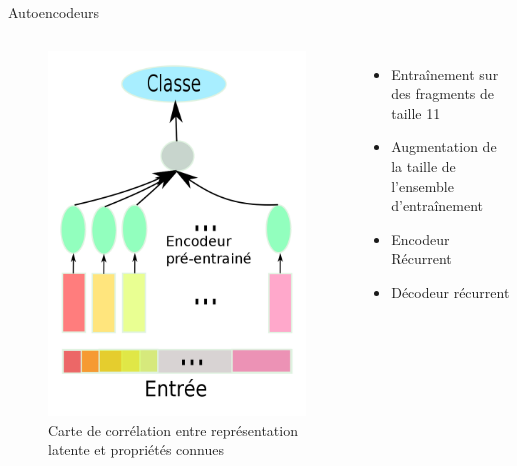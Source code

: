 \documentclass{beamer}
\begin{document}
\begin{frame}{Autoencodeurs}

  \begin{columns}
    \begin{figure}
      \centering
      \includegraphics[scale=0.1]{../Figures/Class}
      \caption{Carte de corrélation entre représentation latente et propriétés connues}
    \end{figure}

    \begin{itemize}
    \item Entraînement sur des fragments de taille 11\pause
    \item Augmentation de la taille de l'ensemble d'entraînement\pause
    \item Encodeur \alert{Récurrent}\pause
    \item Décodeur récurrent
    \end{itemize}
  \end{columns}
  
\end{frame}
\end{document}
